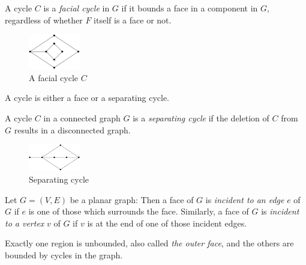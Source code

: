 \begin{definition}
A cycle $C$ is a \textit{facial cycle} in $G$ if it bounds a face in a component in $G$, regardless of whether $F$ itself is a face or not. \cite{dvorak2013threecoloring}
\begin{figure}[H] %
\centering %
\includegraphics[width=0.2\textwidth]{figure/facialcycle.png} 
\caption{A facial cycle $C$} %
\label{figure} %
\end{figure}
\end{definition}

\begin{observation}
A cycle is either a face or a separating cycle.
\end{observation}

\begin{definition}
A cycle $C$ in a connected graph $G$ is a \textit{separating cycle} if the deletion of $C$ from $G$ results in a disconnected graph. \cite{THOMASSEN197857}
\begin{figure}[H] %
\centering %
\includegraphics[width=0.2\textwidth]{figure/separating cycle.png} 
\caption{Separating cycle} %
\label{figure} %
\end{figure}
\end{definition}

\begin{definition}
Let $G = (V, E)$ be a planar graph: Then a face of $G$ is \textit{incident to an edge} $e$ of $G$ if $e$ is one of those which surrounds the face. Similarly, a face of $G$ is \textit{incident to a vertex} $v$ of $G$ if $v$ is at the end of one of those incident edges. \cite{Incident}
\end{definition}

\begin{definition}
Exactly one region is unbounded, also called \textit{the outer face}, and the others are bounded by cycles in the graph. \cite{Theorem}
\end{definition}

